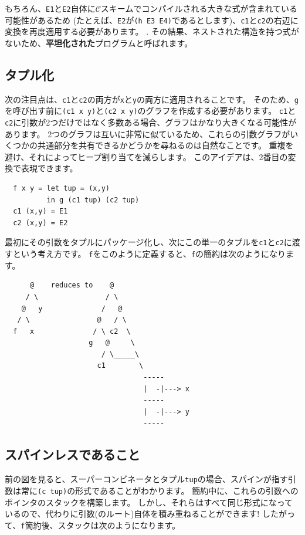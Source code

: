 \documentclass{jbook}
\begin{document}
もちろん、\texttt{E1}と\texttt{E2}自体に$\mathcal{C}$スキームでコンパイルされる大きな式が含まれている可能性があるため
(たとえば、\texttt{E2}が\texttt{(h E3 E4)}であるとします)、\texttt{c1}と\texttt{c2}の右辺に変換を再度適用する必要があります。 .
その結果、ネストされた構造を持つ式がないため、\textbf{平坦化された}プログラムと呼ばれます。

\subsection{タプル化}

次の注目点は、\texttt{c1}と\texttt{c2}の両方が\texttt{x}と\texttt{y}の両方に適用されることです。
そのため、\texttt{g}を呼び出す前に\texttt{(c1 x y)}と\texttt{(c2 x y)}のグラフを作成する必要があります。
\texttt{c1}と\texttt{c2}に引数が2つだけではなく多数ある場合、グラフはかなり大きくなる可能性があります。
2つのグラフは互いに非常に似ているため、これらの引数グラフがいくつかの共通部分を共有できるかどうかを尋ねるのは自然なことです。
重複を避け、それによってヒープ割り当てを減らします。
このアイデアは、2番目の変換で表現できます。

\begin{verbatim}
  f x y = let tup = (x,y)
          in g (c1 tup) (c2 tup)
  c1 (x,y) = E1
  c2 (x,y) = E2
\end{verbatim}

最初にその引数をタプルにパッケージ化し、次にこの単一のタプルを\texttt{c1}と\texttt{c2}に渡すという考え方です。
\texttt{f}をこのように定義すると、\texttt{f}の簡約は次のようになります。

\begin{verbatim}
      @    reduces to    @
     / \                / \
    @   y              /   @
   / \                @   / \
  f   x              / \ c2  \
                    g   @     \
                       / \_____\
                      c1        \
                                 -----
                                 |  -|---> x
                                 -----
                                 |  -|---> y
                                 -----
\end{verbatim}

\subsection{スパインレスであること}

前の図を見ると、スーパーコンビネータとタプル\texttt{tup}の場合、スパインが指す引数は常に\texttt{(c tup)}の形式であることがわかります。
簡約中に、これらの引数へのポインタのスタックを構築します。
しかし、それらはすべて同じ形式になっているので、代わりに引数(のルート)自体を積み重ねることができます!
したがって、\texttt{f}簡約後、スタックは次のようになります。
\end{document}
